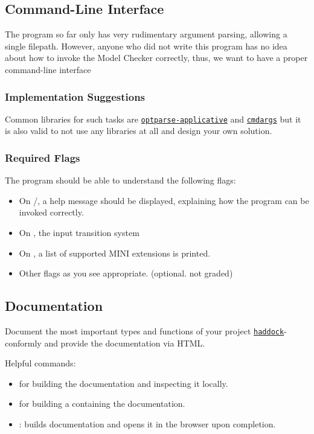 \documentclass{article}
\begin{document}
\subsection{Command-Line Interface}

The program so far only has very rudimentary argument parsing, allowing a single filepath.
However, anyone who did not write this program has no idea about how to invoke the Model Checker correctly,
thus, we want to have a proper command-line interface

\subsubsection*{Implementation Suggestions}

Common libraries for such tasks are \href{https://hackage.haskell.org/package/optparse-applicative}{\texttt{optparse-applicative}} 
and \href{https://hackage.haskell.org/package/cmdargs}{\texttt{cmdargs}} but it is also valid to not use any libraries at all 
and design your own solution.

\subsubsection*{Required Flags}

The program should be able to understand the following flags:

\begin{itemize}
\item On /, a help message should be displayed, explaining how the program can be invoked correctly.
\item On , the input transition system
\item On , a list of supported MINI extensions is printed.
\item Other flags as you see appropriate. (optional. not graded)
\end{itemize}

\subsection{Documentation}

Document the most important types and functions of your project \href{https://haskell-haddock.readthedocs.io/en/latest/markup.html}{\texttt{haddock}}-conformly and provide the documentation via HTML.

Helpful commands:

\begin{itemize}
\item {} for building the documentation and inspecting it locally.
\item {} for building a  containing the documentation.
\item {}: builds documentation and opens it in the browser upon completion.
\end{itemize}
\end{document}
